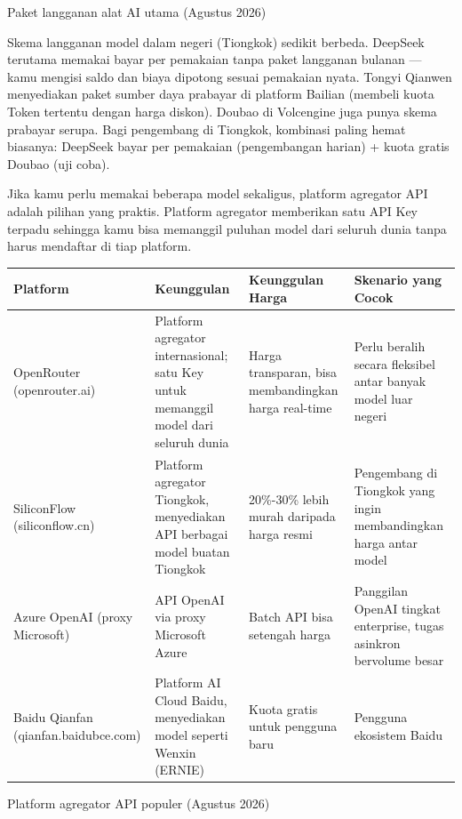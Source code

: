 \begin{center}\small\color{gray}Paket langganan alat AI utama (Agustus 2026)\end{center}

Skema langganan model dalam negeri (Tiongkok) sedikit berbeda. DeepSeek terutama memakai bayar per pemakaian tanpa paket langganan bulanan — kamu mengisi saldo dan biaya dipotong sesuai pemakaian nyata. Tongyi Qianwen menyediakan paket sumber daya prabayar di platform Bailian (membeli kuota Token tertentu dengan harga diskon). Doubao di Volcengine juga punya skema prabayar serupa. Bagi pengembang di Tiongkok, kombinasi paling hemat biasanya: DeepSeek bayar per pemakaian (pengembangan harian) + kuota gratis Doubao (uji coba).


Jika kamu perlu memakai beberapa model sekaligus, platform agregator API adalah pilihan yang praktis. Platform agregator memberikan satu API Key terpadu sehingga kamu bisa memanggil puluhan model dari seluruh dunia tanpa harus mendaftar di tiap platform.

\begin{center}
\begin{tabularx}{\linewidth}{|X|X|X|X|}
\hline
\textbf{Platform} & \textbf{Keunggulan} & \textbf{Keunggulan Harga} & \textbf{Skenario yang Cocok} \tabularnewline
\hline
OpenRouter (openrouter.ai) & Platform agregator internasional; satu Key untuk memanggil model dari seluruh dunia & Harga transparan, bisa membandingkan harga real-time & Perlu beralih secara fleksibel antar banyak model luar negeri \tabularnewline
SiliconFlow (siliconflow.cn) & Platform agregator Tiongkok, menyediakan API berbagai model buatan Tiongkok & 20\%-30\% lebih murah daripada harga resmi & Pengembang di Tiongkok yang ingin membandingkan harga antar model \tabularnewline
Azure OpenAI (proxy Microsoft) & API OpenAI via proxy Microsoft Azure & Batch API bisa setengah harga & Panggilan OpenAI tingkat enterprise, tugas asinkron bervolume besar \tabularnewline
Baidu Qianfan (qianfan.baidubce.com) & Platform AI Cloud Baidu, menyediakan model seperti Wenxin (ERNIE) & Kuota gratis untuk pengguna baru & Pengguna ekosistem Baidu \tabularnewline
\hline
\end{tabularx}
\end{center}

\begin{center}\small\color{gray}Platform agregator API populer (Agustus 2026)\end{center}


